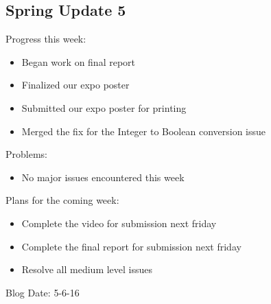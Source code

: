 \subsection{Spring Update 5}
Progress this week:
\begin{itemize}
   \item Began work on final report
   \item Finalized our expo poster
   \item Submitted our expo poster for printing
   \item Merged the fix for the Integer to Boolean conversion issue
\end{itemize}
Problems:
\begin{itemize}
   \item No major issues encountered this week
\end{itemize}
Plans for the coming week:
\begin{itemize}
   \item Complete the video for submission next friday
   \item Complete the final report for submission next friday
   \item Resolve all medium level issues
\end{itemize}
Blog Date: 5-6-16

